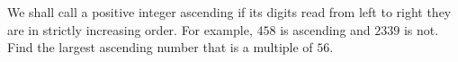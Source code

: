 We shall call a positive integer ascending  if its digits read from left to right they are in strictly increasing order. For example, $458$ is ascending and $2339$ is not. Find the largest ascending number that is a multiple of $56$.
